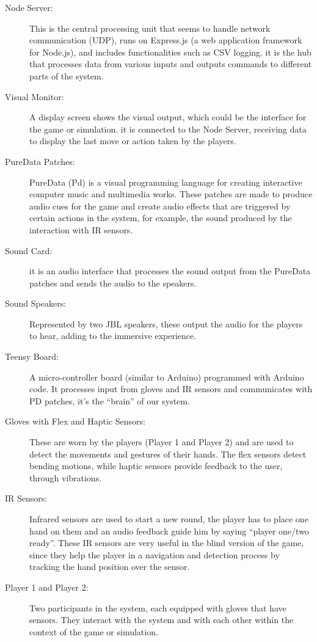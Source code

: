 \documentclass[11pt,a4paper]{report}
\begin{document}
\begin{description}
  \item [Node Server:] This is the central processing unit that seems to handle network communication (UDP), runs on Express.js (a web application framework for Node.js), and includes functionalities such as CSV logging. it is the hub that processes data from various inputs and outputs commands to different parts of the system.
  \item [Visual Monitor:] A display screen shows the visual output, which could be the interface for the game or simulation. it is connected to the Node Server, receiving data to display the last move or action taken by the players.
  \item [PureData Patches:] PureData (Pd) is a visual programming language for creating interactive computer music and multimedia works. These patches are made to produce audio cues for the game and create audio effects that are triggered by certain actions in the system, for example, the sound produced by the interaction with IR sensors.
  \item [Sound Card:] it is an audio interface that processes the sound output from the PureData patches and sends the audio to the speakers.
  \item [Sound Speakers:] Represented by two JBL speakers, these output the audio for the players to hear, adding to the immersive experience.
  \item [Teensy Board:] A micro-controller board (similar to Arduino) programmed with Arduino code. It processes input from gloves and IR sensors and communicates with PD patches, it’s the “brain” of our system.
  \item [Gloves with Flex and Haptic Sensors:] These are worn by the players (Player 1 and Player 2) and are used to detect the movements and gestures of their hands. The flex sensors detect bending motions, while haptic sensors provide feedback to the user, through vibrations.
  \item [IR Sensors:] Infrared sensors are used to start a new round, the player has to place one hand on them and an audio feedback guide him by saying “player one/two ready”. These IR sensors are very useful in the blind version of the game, since they help the player in a navigation and detection process by tracking the hand position over the sensor.
  \item [Player 1 and Player 2:] Two participants in the system, each equipped with gloves that have sensors. They interact with the system and with each other within the context of the game or simulation.
\end{description}
\end{document}
